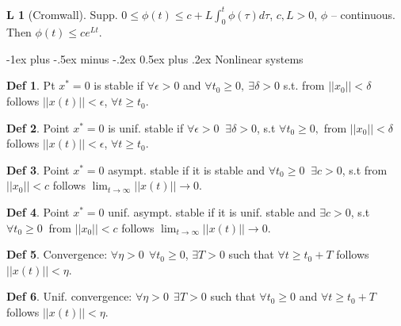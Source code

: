\documentclass[9pt,landscape]{article}
\makeatletter
\theoremstyle{definition}
\newtheorem*{Lemma}{L}
\newtheorem*{Definition}{Def}
\renewcommand{\section}{\@startsection{section}{1}{0mm}%
                                {-1ex plus -.5ex minus -.2ex}%
                                {0.5ex plus .2ex}%
                                {\normalfont\large\bfseries}}
\makeatother
\begin{document}
\raggedright
\footnotesize
\begin{multicols}{4}


\setlength{\premulticols}{1pt}
\setlength{\postmulticols}{1pt}
\setlength{\multicolsep}{1pt}
\setlength{\columnsep}{2pt}



\begin{Lemma}[Cromwall]
Supp. $0 \le \phi(t) \le c + L \int^t_0 \phi(\tau) d \tau$, $c,L > 0$, $\phi$ -- 
continuous. Then $\phi(t) \le c e^{Lt}$.
\end{Lemma}

\section{Nonlinear systems}

\begin{Definition}
 Pt $x^*=0$ is stable if $\forall \epsilon > 0$ and 
 $\forall t_0 \ge 0,\ \exists \delta>0$ s.t. from $||x_0||<\delta$
 follows $||x(t)|| < \epsilon$, $\forall t  \ge t_0$.
\end{Definition}

\begin{Definition}
 Point $x^*=0$ is unif. stable if $\forall \epsilon > 0\ $  
 $\exists \delta>0$, s.t $\forall t_0 \ge 0,$ from $||x_0||<\delta$
 follows $||x(t)|| < \epsilon$, $\forall t  \ge t_0$.
\end{Definition}

\begin{Definition}
 Point $x^*=0$ asympt. stable if it is stable and $\forall t_0 \ge 0\ $  
 $\exists c>0$, s.t from $||x_0||<c$
 follows $\lim_{t\to \infty} ||x(t)|| \to 0$.
\end{Definition}

\begin{Definition}
 Point $x^*=0$ unif. asympt. stable if it is unif. stable and 
 $\exists c>0$, s.t $\forall t_0 \ge 0\ $ from $||x_0||<c$
 follows $\lim_{t\to \infty} ||x(t)|| \to 0$.
\end{Definition}

\begin{Definition}
 Convergence: $\forall \eta > 0 \ \ \forall t_0 \ge 0$, $\exists T>0$ such
 that $\forall t \ge t_0+T$ follows $||x(t)||<\eta$.
\end{Definition}

\begin{Definition}
 Unif. convergence: $\forall \eta > 0 \ \ \exists T>0$ such
 that $\forall t_0 \ge 0$ and $\forall t \ge t_0+T$ follows $||x(t)||<\eta$.
\end{Definition}


\end{multicols}
\end{document}
